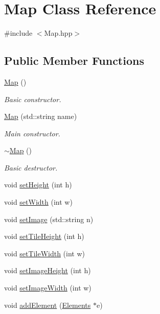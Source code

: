 \hypertarget{class_map}{\section{Map Class Reference}
\label{class_map}
}


{\ttfamily \#include $<$Map.\-hpp$>$}

\subsection*{Public Member Functions}
\begin{DoxyCompactItemize}
\item 
\hyperlink{class_map_a0f5ad0fd4563497b4214038cbca8b582}{Map} ()
\begin{DoxyCompactList}\small\item\em Basic constructor. \end{DoxyCompactList}\item 
\hyperlink{class_map_aeec3ac95150a6a9df4a417be707bcf9d}{Map} (std\-::string name)
\begin{DoxyCompactList}\small\item\em Main constructor. \end{DoxyCompactList}\item 
\hyperlink{class_map_aa403fbe09394ccf39747588f5168e3b2}{$\sim$\-Map} ()
\begin{DoxyCompactList}\small\item\em Basic destructor. \end{DoxyCompactList}\item 
void \hyperlink{class_map_affab3537641a7985559f83ea083e00ca}{set\-Height} (int h)
\item 
void \hyperlink{class_map_a2915ccde4d8a2ba8142677baea803467}{set\-Width} (int w)
\item 
void \hyperlink{class_map_a7ac17b33fc7266fcc30b19c33c70c3ca}{set\-Image} (std\-::string n)
\item 
void \hyperlink{class_map_a7faf61ea4f43b4c1e15bd3d8744366b6}{set\-Tile\-Height} (int h)
\item 
void \hyperlink{class_map_a88d4cda4b476ae4ee3487786b0feccd9}{set\-Tile\-Width} (int w)
\item 
void \hyperlink{class_map_ada51d21543808fa10d085c3c09bda7f9}{set\-Image\-Height} (int h)
\item 
void \hyperlink{class_map_a38f4a514bf3993ef816b6feda56ab36e}{set\-Image\-Width} (int w)
\item 
void \hyperlink{class_map_a8b3a39287db471b6faec3cfb281b2da6}{add\-Element} (\hyperlink{class_elements}{Elements} $\ast$e)

\end{DoxyCompactItemize}
